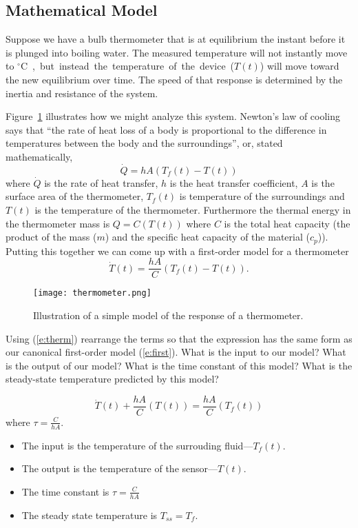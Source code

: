 \subsection{Mathematical Model}
Suppose we have a bulb thermometer that is at equilibrium the instant before it is plunged into boiling water.  The measured temperature will not instantly move to \unit[100]{$^{\circ}$C}, but instead the temperature of the device ($T(t)$) will move toward the new equilibrium over time.  The speed of that response is determined by the inertia and resistance of the system.

Figure~\ref{f:therm} illustrates how we might analyze this system.  Newton's law of cooling says that ``the rate of heat loss of a body is proportional to the difference in temperatures between the body and the surroundings'', or, stated mathematically,
\begin{equation}
\dot{Q}=hA (T_f(t)-T(t))
\end{equation}
where $\dot{Q}$ is the rate of heat transfer, $h$ is the heat transfer coefficient, $A$ is the surface area of the thermometer, $T_f(t)$ is temperature of the surroundings and $T(t)$ is the temperature of the thermometer.  Furthermore the thermal energy in the thermometer mass is $Q=C(T(t))$ where $C$ is the total heat capacity (the product of the mass ($m$) and the specific heat capacity of the material ($c_p$)).  Putting this together we can come up with a first-order model for a thermometer
\begin{equation}
\label{e:therm}
\dot{T}(t)= \frac{hA}{C}(T_f(t)-T(t)).
\end{equation}

\begin{figure}[hbt]
\centering
\texttt{[image: thermometer.png]}
\caption{Illustration of a simple model of the response of a thermometer.}
\label{f:therm}
\end{figure}

\begin{ex}
Using (\ref{e:therm}) rearrange the terms so that the expression has the same form as our canonical first-order model (\ref{e:first}).    What is the input to our model?  What is the output of our model?  What is the time constant of this model?  What is the steady-state temperature predicted by this model?
\end{ex}

\ifsolutions
\begin{soln}
\[ 
\dot{T}(t)+\frac{hA}{C}(T(t)) = \frac{hA}{C} (T_f(t)) 
\]
where $\tau = \frac{C}{hA}$.
\begin{itemize}
\item The input is the temperature of the surrouding fluid---$T_f(t)$.
\item The output is the temperature of the sensor---$T(t)$.
\item The time constant is $\tau = \frac{C}{hA}$
\item The steady state temperature is $T_{ss}=T_f$.
\end{itemize}
\end{soln}
\fi
